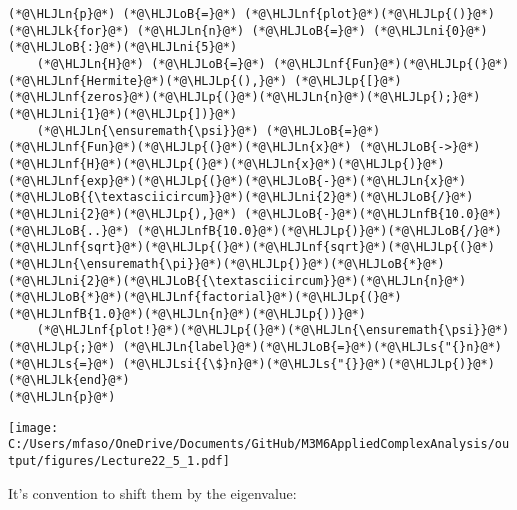 \documentclass[12pt,a4paper]{article}
\newcommand{\HLJLk}[1]{\textcolor[RGB]{148,91,176}{\textbf{#1}}}
\newcommand{\HLJLn}[1]{#1}
\newcommand{\HLJLnf}[1]{\textcolor[RGB]{66,102,213}{#1}}
\newcommand{\HLJLs}[1]{\textcolor[RGB]{201,61,57}{#1}}
\newcommand{\HLJLsi}[1]{#1}
\newcommand{\HLJLnfB}[1]{\textcolor[RGB]{59,151,46}{#1}}
\newcommand{\HLJLni}[1]{\textcolor[RGB]{59,151,46}{#1}}
\newcommand{\HLJLoB}[1]{\textcolor[RGB]{102,102,102}{\textbf{#1}}}
\newcommand{\HLJLp}[1]{#1}
\begin{document}
\begin{lstlisting}
(*@\HLJLn{p}@*) (*@\HLJLoB{=}@*) (*@\HLJLnf{plot}@*)(*@\HLJLp{()}@*)
(*@\HLJLk{for}@*) (*@\HLJLn{n}@*) (*@\HLJLoB{=}@*) (*@\HLJLni{0}@*)(*@\HLJLoB{:}@*)(*@\HLJLni{5}@*)
    (*@\HLJLn{H}@*) (*@\HLJLoB{=}@*) (*@\HLJLnf{Fun}@*)(*@\HLJLp{(}@*)(*@\HLJLnf{Hermite}@*)(*@\HLJLp{(),}@*) (*@\HLJLp{[}@*)(*@\HLJLnf{zeros}@*)(*@\HLJLp{(}@*)(*@\HLJLn{n}@*)(*@\HLJLp{);}@*)(*@\HLJLni{1}@*)(*@\HLJLp{])}@*)
    (*@\HLJLn{\ensuremath{\psi}}@*) (*@\HLJLoB{=}@*) (*@\HLJLnf{Fun}@*)(*@\HLJLp{(}@*)(*@\HLJLn{x}@*) (*@\HLJLoB{->}@*) (*@\HLJLnf{H}@*)(*@\HLJLp{(}@*)(*@\HLJLn{x}@*)(*@\HLJLp{)}@*)(*@\HLJLnf{exp}@*)(*@\HLJLp{(}@*)(*@\HLJLoB{-}@*)(*@\HLJLn{x}@*)(*@\HLJLoB{{\textasciicircum}}@*)(*@\HLJLni{2}@*)(*@\HLJLoB{/}@*)(*@\HLJLni{2}@*)(*@\HLJLp{),}@*) (*@\HLJLoB{-}@*)(*@\HLJLnfB{10.0}@*) (*@\HLJLoB{..}@*) (*@\HLJLnfB{10.0}@*)(*@\HLJLp{)}@*)(*@\HLJLoB{/}@*)(*@\HLJLnf{sqrt}@*)(*@\HLJLp{(}@*)(*@\HLJLnf{sqrt}@*)(*@\HLJLp{(}@*)(*@\HLJLn{\ensuremath{\pi}}@*)(*@\HLJLp{)}@*)(*@\HLJLoB{*}@*)(*@\HLJLni{2}@*)(*@\HLJLoB{{\textasciicircum}}@*)(*@\HLJLn{n}@*)(*@\HLJLoB{*}@*)(*@\HLJLnf{factorial}@*)(*@\HLJLp{(}@*)(*@\HLJLnfB{1.0}@*)(*@\HLJLn{n}@*)(*@\HLJLp{))}@*)
    (*@\HLJLnf{plot!}@*)(*@\HLJLp{(}@*)(*@\HLJLn{\ensuremath{\psi}}@*)(*@\HLJLp{;}@*) (*@\HLJLn{label}@*)(*@\HLJLoB{=}@*)(*@\HLJLs{"{}n}@*) (*@\HLJLs{=}@*) (*@\HLJLsi{{\$}n}@*)(*@\HLJLs{"{}}@*)(*@\HLJLp{)}@*)
(*@\HLJLk{end}@*)
(*@\HLJLn{p}@*)
\end{lstlisting}

\texttt{[image: C:/Users/mfaso/OneDrive/Documents/GitHub/M3M6AppliedComplexAnalysis/output/figures/Lecture22\_5\_1.pdf]}

It's convention to shift them by the eigenvalue:
\end{document}
